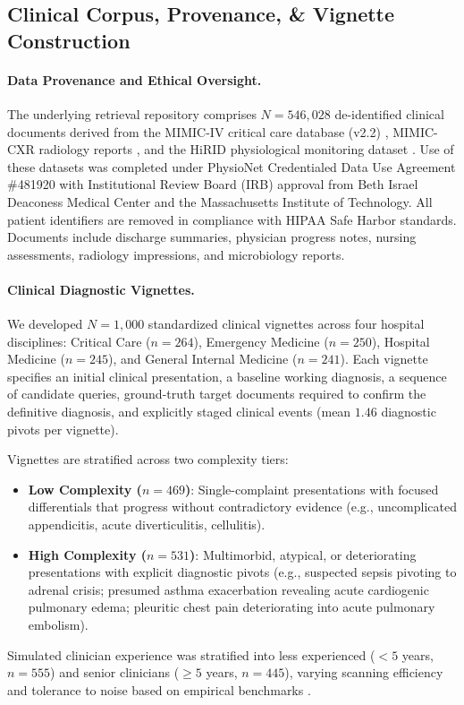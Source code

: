 \documentclass[10pt, onecolumn]{article}
\begin{document}
\subsection{Clinical Corpus, Provenance, \& Vignette Construction}

\paragraph{Data Provenance and Ethical Oversight.}
The underlying retrieval repository comprises $N = 546{,}028$ de-identified clinical documents derived from the MIMIC-IV critical care database (v2.2) \cite{johnson2023mimic}, MIMIC-CXR radiology reports \cite{johnson2019mimiccxr}, and the HiRID physiological monitoring dataset \cite{hyland2020hirid}. Use of these datasets was completed under PhysioNet Credentialed Data Use Agreement \#481920 with Institutional Review Board (IRB) approval from Beth Israel Deaconess Medical Center and the Massachusetts Institute of Technology. All patient identifiers are removed in compliance with HIPAA Safe Harbor standards. Documents include discharge summaries, physician progress notes, nursing assessments, radiology impressions, and microbiology reports.

\paragraph{Clinical Diagnostic Vignettes.}
We developed $N = 1{,}000$ standardized clinical vignettes across four hospital disciplines: Critical Care ($n=264$), Emergency Medicine ($n=250$), Hospital Medicine ($n=245$), and General Internal Medicine ($n=241$). Each vignette specifies an initial clinical presentation, a baseline working diagnosis, a sequence of candidate queries, ground-truth target documents required to confirm the definitive diagnosis, and explicitly staged clinical events (mean $1.46$ diagnostic pivots per vignette).

Vignettes are stratified across two complexity tiers:
\begin{itemize}
  \item \textbf{Low Complexity ($n=469$)}: Single-complaint presentations with focused differentials that progress without contradictory evidence (e.g., uncomplicated appendicitis, acute diverticulitis, cellulitis).
  \item \textbf{High Complexity ($n=531$)}: Multimorbid, atypical, or deteriorating presentations with explicit diagnostic pivots (e.g., suspected sepsis pivoting to adrenal crisis; presumed asthma exacerbation revealing acute cardiogenic pulmonary edema; pleuritic chest pain deteriorating into acute pulmonary embolism).
\end{itemize}
Simulated clinician experience was stratified into less experienced ($<5$ years, $n=555$) and senior clinicians ($\ge 5$ years, $n=445$), varying scanning efficiency and tolerance to noise based on empirical benchmarks \cite{harry2018cognitive,tubbs2020balancing}.
\end{document}
